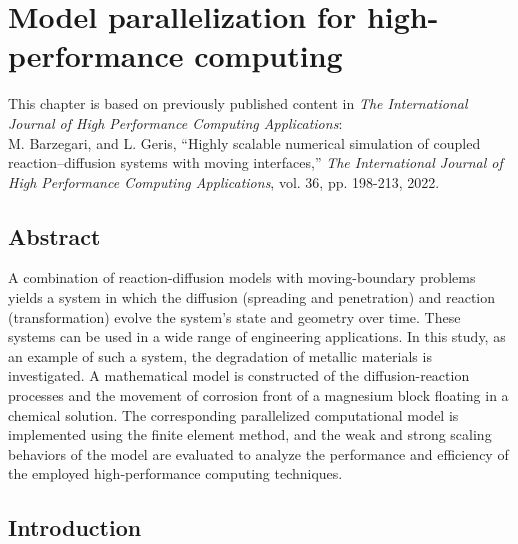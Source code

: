 \chapter{Model parallelization for high-performance computing}\label{ch:hpc}


\begin{shaded}
This chapter is based on previously published content in \textit{The International Journal of High Performance Computing Applications}:\\
M. Barzegari, and L. Geris, ``Highly scalable numerical simulation of coupled reaction–diffusion systems with moving interfaces,'' \textit{The International Journal of High Performance Computing Applications}, vol. 36, pp. 198-213, 2022.
\end{shaded}

\section*{Abstract}

A combination of reaction-diffusion models with moving-boundary problems yields a system in which the diffusion (spreading and penetration) and reaction (transformation) evolve the system's state and geometry over time. These systems can be used in a wide range of engineering applications. In this study, as an example of such a system, the degradation of metallic materials is investigated. A mathematical model is constructed of the diffusion-reaction processes and the movement of corrosion front of a magnesium block floating in a chemical solution. The corresponding parallelized computational model is implemented using the finite element method, and the weak and strong scaling behaviors of the model are evaluated to analyze the performance and efficiency of the employed high-performance computing techniques.

\section{Introduction}

